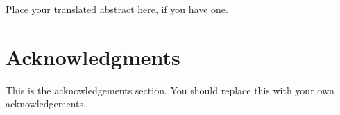 \begin{trabstractpage}
Place your translated abstract here, if you have one. 
\end{trabstractpage}



% 

\cleardoublepage


\readerpage

\cleardoublepage

\section*{Acknowledgments}

This is the acknowledgements section.  You should replace this with your
own acknowledgements.

\restoregeometry



